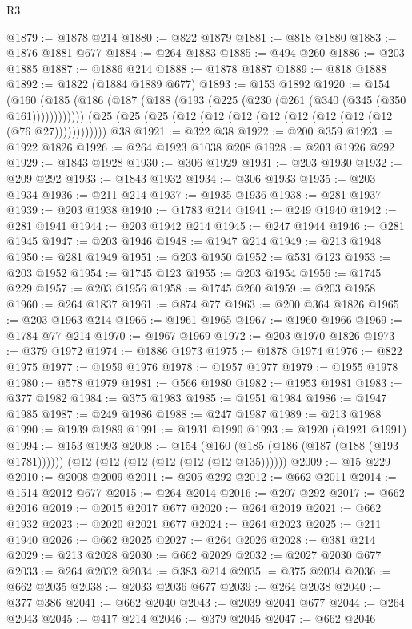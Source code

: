 \begin{lexlean}{R3}
\begin{coremodule}
@1879 := @1878 @214
@1880 := @822 @1879
@1881 := @818 @1880
@1883 := @1876 @1881 @677
@1884 := @264 @1883
@1885 := @494 @260
@1886 := @203 @1885
@1887 := @1886 @214
@1888 := @1878 @1887
@1889 := @818 @1888
@1892 := @1822 (@1884 @1889 @677)
@1893 := @153 @1892
@1920 := @154
    (@160 (@185 (@186 (@187 (@188 (@193 (@225 (@230 (@261 (@340 (@345 (@350 @161))))))))))))
    (@25 (@25 (@25 (@12 (@12 (@12 (@12 (@12 (@12 (@12 (@12 (@76 @27))))))))))))
    @38
@1921 := @322 @38
@1922 := @200 @359
@1923 := @1922 @1826
@1926 := @264 @1923 @1038 @208
@1928 := @203 @1926 @292
@1929 := @1843 @1928
@1930 := @306 @1929
@1931 := @203 @1930
@1932 := @209 @292
@1933 := @1843 @1932
@1934 := @306 @1933
@1935 := @203 @1934
@1936 := @211 @214
@1937 := @1935 @1936
@1938 := @281 @1937
@1939 := @203 @1938
@1940 := @1783 @214
@1941 := @249 @1940
@1942 := @281 @1941
@1944 := @203 @1942 @214
@1945 := @247 @1944
@1946 := @281 @1945
@1947 := @203 @1946
@1948 := @1947 @214
@1949 := @213 @1948
@1950 := @281 @1949
@1951 := @203 @1950
@1952 := @531 @123
@1953 := @203 @1952
@1954 := @1745 @123
@1955 := @203 @1954
@1956 := @1745 @229
@1957 := @203 @1956
@1958 := @1745 @260
@1959 := @203 @1958
@1960 := @264 @1837
@1961 := @874 @77
@1963 := @200 @364 @1826
@1965 := @203 @1963 @214
@1966 := @1961 @1965
@1967 := @1960 @1966
@1969 := @1784 @77 @214
@1970 := @1967 @1969
@1972 := @203 @1970 @1826
@1973 := @379 @1972
@1974 := @1886 @1973
@1975 := @1878 @1974
@1976 := @822 @1975
@1977 := @1959 @1976
@1978 := @1957 @1977
@1979 := @1955 @1978
@1980 := @578 @1979
@1981 := @566 @1980
@1982 := @1953 @1981
@1983 := @377 @1982
@1984 := @375 @1983
@1985 := @1951 @1984
@1986 := @1947 @1985
@1987 := @249 @1986
@1988 := @247 @1987
@1989 := @213 @1988
@1990 := @1939 @1989
@1991 := @1931 @1990
@1993 := @1920 (@1921 @1991)
@1994 := @153 @1993
@2008 := @154
    (@160 (@185 (@186 (@187 (@188 (@193 @1781))))))
    (@12 (@12 (@12 (@12 (@12 (@12 @135))))))
@2009 := @15 @229
@2010 := @2008 @2009
@2011 := @205 @292
@2012 := @662 @2011
@2014 := @1514 @2012 @677
@2015 := @264 @2014
@2016 := @207 @292
@2017 := @662 @2016
@2019 := @2015 @2017 @677
@2020 := @264 @2019
@2021 := @662 @1932
@2023 := @2020 @2021 @677
@2024 := @264 @2023
@2025 := @211 @1940
@2026 := @662 @2025
@2027 := @264 @2026
@2028 := @381 @214
@2029 := @213 @2028
@2030 := @662 @2029
@2032 := @2027 @2030 @677
@2033 := @264 @2032
@2034 := @383 @214
@2035 := @375 @2034
@2036 := @662 @2035
@2038 := @2033 @2036 @677
@2039 := @264 @2038
@2040 := @377 @386
@2041 := @662 @2040
@2043 := @2039 @2041 @677
@2044 := @264 @2043
@2045 := @417 @214
@2046 := @379 @2045
@2047 := @662 @2046

\end{coremodule}
\end{lexlean}

